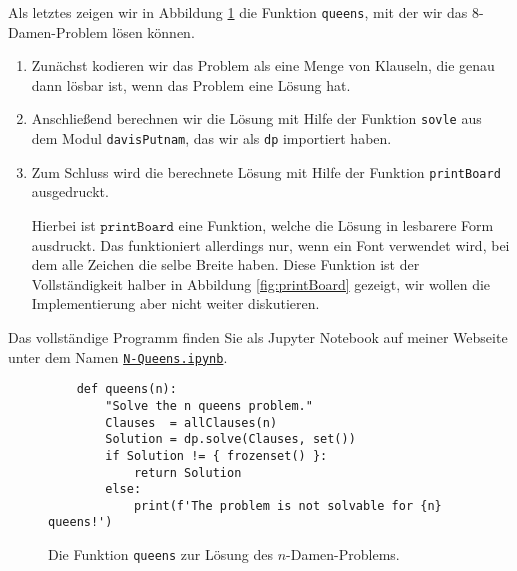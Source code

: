 Als letztes zeigen wir in Abbildung \ref{fig:solve:queens} die Funktion
\texttt{queens}, mit der wir das 8-Damen-Problem lösen können.
\begin{enumerate}
\item Zunächst kodieren wir das Problem als eine Menge von Klauseln, die genau dann lösbar ist,
      wenn das Problem eine Lösung hat.
\item Anschließend berechnen wir die Lösung mit Hilfe der Funktion \texttt{sovle} aus dem Modul
      \texttt{davisPutnam}, das wir als \texttt{dp} importiert haben.
\item Zum Schluss wird die berechnete Lösung mit Hilfe der Funktion \texttt{printBoard} ausgedruckt.

      Hierbei ist $\texttt{printBoard}$ eine Funktion, welche die Lösung in lesbarere Form 
      ausdruckt.  Das funktioniert allerdings nur, wenn ein Font verwendet wird, bei dem alle Zeichen die
      selbe Breite haben.  Diese Funktion ist der Vollständigkeit halber in Abbildung \ref{fig:printBoard}
      gezeigt, wir wollen die Implementierung aber nicht weiter diskutieren.
\end{enumerate}
Das vollständige Programm finden Sie als Jupyter Notebook auf meiner Webseite unter dem Namen
\href{https://github.com/karlstroetmann/Logic/blob/master/Python/N-Queens.ipynb}{\texttt{N-Queens.ipynb}}.


\begin{figure}[!ht]
\centering
\begin{verbatim}
    def queens(n):
        "Solve the n queens problem."
        Clauses  = allClauses(n)
        Solution = dp.solve(Clauses, set())
        if Solution != { frozenset() }:
            return Solution
        else:
            print(f'The problem is not solvable for {n} queens!')
\end{verbatim}
\vspace*{-0.3cm}
\caption{Die Funktion \texttt{queens} zur Lösung des $n$-Damen-Problems.}
\label{fig:solve:queens}
\end{figure}



